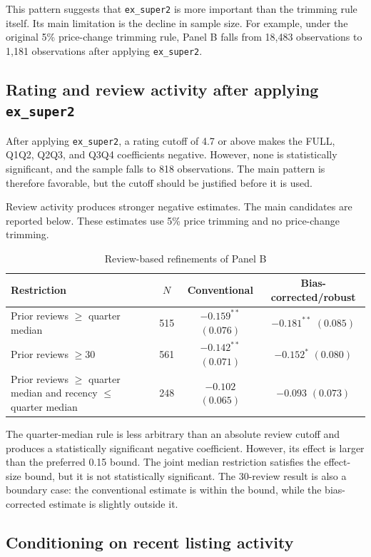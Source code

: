 \documentclass[12pt]{article}
\begin{document}
This pattern suggests that \texttt{ex\_super2} is more important than the
trimming rule itself. Its main limitation is the decline in sample size. For
example, under the original 5\% price-change trimming rule, Panel B falls from
18,483 observations to 1,181 observations after applying \texttt{ex\_super2}.


\subsection{Rating and review activity after applying \texttt{ex\_super2}}

After applying \texttt{ex\_super2}, a rating cutoff of 4.7 or above makes the
FULL, Q1Q2, Q2Q3, and Q3Q4 coefficients negative. However, none is
statistically significant, and the sample falls to 818 observations. The main
pattern is therefore favorable, but the cutoff should be justified before it
is used.

Review activity produces stronger negative estimates. The main candidates are
reported below. These estimates use 5\% price trimming and no price-change
trimming.

\begin{table}[h]
\centering
\caption{Review-based refinements of Panel B}
\label{tab:review_refinements}
\small
\begin{tabular}{p{}ccc}
\hline
Restriction & $N$ & Conventional & Bias-corrected/robust \\
\hline
Prior reviews $\geq$ quarter median
 & 515 & $-0.159^{**}$ $(0.076)$ & $-0.181^{**}$ $(0.085)$ \\
Prior reviews $\geq 30$
 & 561 & $-0.142^{**}$ $(0.071)$ & $-0.152^{*}$ $(0.080)$ \\
Prior reviews $\geq$ quarter median and recency $\leq$ quarter median
 & 248 & $-0.102$ $(0.065)$ & $-0.093$ $(0.073)$ \\
\hline
\end{tabular}
\end{table}

The quarter-median rule is less arbitrary than an absolute review cutoff and
produces a statistically significant negative coefficient. However, its
effect is larger than the preferred 0.15 bound. The joint median restriction
satisfies the effect-size bound, but it is not statistically significant.
The 30-review result is also a boundary case: the conventional estimate is
within the bound, while the bias-corrected estimate is slightly outside it.


\subsection{Conditioning on recent listing activity}
\end{document}
